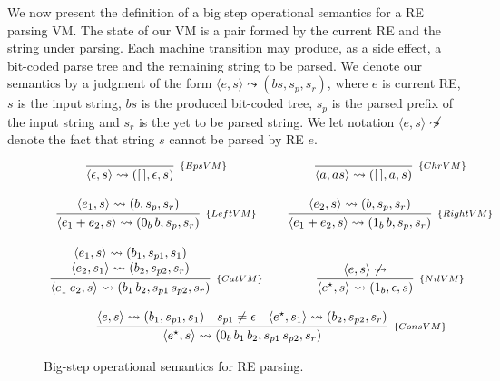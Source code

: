 \documentclass[oneside,12pt]{scrbook}
\theoremstyle{definition}
\theoremstyle{plain}
\theoremstyle{definition}
\begin{document}
We now present the definition of a big step operational semantics
for a RE parsing VM.
The state of our VM is a pair formed by the current RE and the string under parsing. Each machine 
transition may produce, as a side effect, a bit-coded parse tree and the remaining string to be 
parsed. We denote our semantics by a judgment of the form $\langle e, s \rangle \leadsto (bs,s_p,s_r)$,
where $e$ is current RE, $s$ is the input string, $bs$ is the produced bit-coded tree, $s_p$ is
the parsed prefix of the input string and $s_r$ is the yet to be parsed string.
We let notation $\langle e, s \rangle\not\leadsto$ denote the fact that string
$s$ cannot be parsed by RE $e$.

\begin{figure}[h]
	\[
	\begin{array}{ccc}
	\infer[_{\{EpsVM\}}]{\langle \epsilon, s\rangle \leadsto ([\,],\epsilon,s)}{} & &
	\infer[_{\{ChrVM\}}]{\langle a, as\rangle\leadsto ([\,],a,s)}{} \\ \\
	\infer[_{\{LeftVM\}}]{\langle e_1 + e_2,s\rangle\leadsto (0_b\,b,s_p,s_r)}{\langle e_1, s\rangle \leadsto (b,s_p,s_r)} & &
	\infer[_{\{RightVM\}}]{\langle e_1 + e_2,s\rangle\leadsto (1_b\,b,s_p,s_r)}{
		\langle e_2, s\rangle \leadsto (b,s_p,s_r)} \\ \\
	\infer[_{\{CatVM\}}]{\langle e_1\:e_2,s\rangle\leadsto (b_1\,b_2,s_{p1}\,s_{p2},s_r)}
	{\begin{array}{c}
		\langle e_1, s\rangle \leadsto (b_1,s_{p1},s_1) \\
		\langle e_2, s_1\rangle \leadsto (b_2,s_{p2},s_r)
		\end{array}} & & 
	\infer[_{\{NilVM\}}]{\langle e^\star, s\rangle\leadsto
		(1_b,\epsilon,s)}{\langle e, s \rangle
		\not\leadsto}\\ \\
	
	\multicolumn{3}{c}{
		\infer[_{\{ConsVM\}}]{\langle e^\star, s\rangle\leadsto (0_b\,b_1\,b_2,s_{p1}\,s_{p2},s_r)}
		{\langle e, s \rangle \leadsto (b_1,s_{p1},s_1) & s_{p1} \neq \epsilon &
			\langle e^\star, s_1 \rangle \leadsto (b_2, s_{p2},s_r)}
	}
	\end{array}
	\]
	\caption{Big-step operational semantics for RE parsing.}
	\label{figure:bigstepsemantics}
\end{figure}
\end{document}
